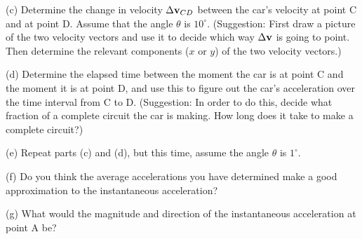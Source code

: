 \vfil\eject

(c) Determine the change in velocity $\Delta {\bf v}_{CD}$ between the
car's velocity at point C and at point D.  Assume that the angle $\theta$
is $10^\circ$.  (Suggestion: First draw a picture of the two
velocity vectors and use it to decide which way
$\Delta{\bf v}$ is going to point.  Then determine the relevant
components ($x$ or $y$) of the two velocity vectors.)

\vfil

(d) Determine the elapsed time between the moment the car is at
point C and the moment it is at point D, and use this to figure out
the car's acceleration over the time interval from C to D.
(Suggestion: In order to do this, decide what fraction of a complete
circuit the car is making.  How long does it take to make a complete circuit?)

\vfil\eject

(e) Repeat parts (c) and (d), but this time, assume the angle $\theta$ is 
$1^\circ$.

\vfil

(f) Do you think the average accelerations you have determined make a good
approximation to the instantaneous acceleration?

\vskip 0.8in

(g) What would the magnitude and direction of the instantaneous acceleration
at point A be?

\vskip 0.8in\eject

